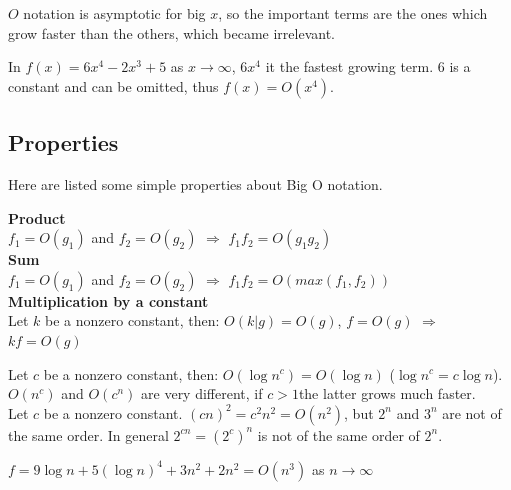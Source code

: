 \(O\) notation is asymptotic for big \(x\), so the important terms are the ones which grow faster than the others, which became irrelevant.

\begin{example}
In \(f(x) = 6x^{4} - 2x^{3} + 5\) as \(x \rightarrow \infty\), \(6x^{4}\) it the fastest growing term. \(6\) is a constant and can be omitted, thus \(f(x)=O(x^{4})\).  
\end{example}

\subsection{Properties}
Here are listed some simple properties about Big O notation.
\begin{kaobox}[frametitle=Product-Sum-Multiplication by a constant]
\textbf{Product} \\
\(f_{1}=O(g_{1})\) and \(f_{2}=O(g_{2})\) \(\Rightarrow\) \(f_{1}f_{2}=O(g_{1}g_{2})\)
\\
\textbf{Sum} \\
\(f_{1}=O(g_{1})\) and \(f_{2}=O(g_{2})\) \(\Rightarrow\) \(f_{1}f_{2}=O(max(f_{1}, f_{2}))\)
\\
\textbf{Multiplication by a constant} \\
Let \(k\) be a nonzero constant, then: 
\(O(k|g)=O(g)\), \(f=O(g)\) \(\Rightarrow\)\(kf=O(g)\)
\end{kaobox}

\begin{kaobox}[frametitle=Logarithm and Exponential]
Let \(c\) be a nonzero constant, then: \(O(\log n^{c}) = O(\log n)\) (\(\log n^{c} = c \log n\)).
\\
\(O(n^{c})\) and \(O(c^{n})\) are very different, if \(c>1\)the latter grows much faster.
\\
Let \(c\) be a nonzero constant. \((cn)^{2}=c^{2}n^{2} = O(n^{2})\), but \(2^{n}\) and \(3^{n}\) are not of the same order. In general \(2^{cn}=(2^{c})^{n}\) is not of the same order of \(2^{n}\).
\end{kaobox}

\begin{example}
\(f = 9 \log n + 5(\log n)^{4} + 3n^{2} + 2n^{2} = O(n^{3})\) as \(n \rightarrow \infty\)
\end{example}

